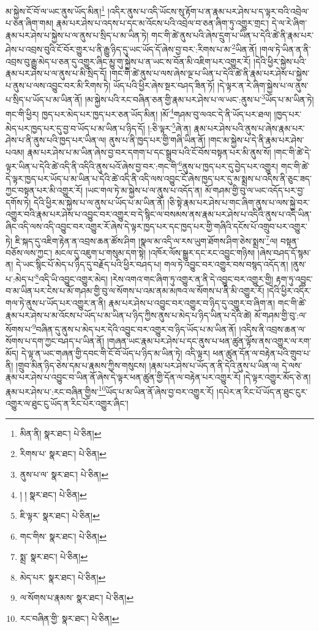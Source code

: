 མ་སྐྱེས་ངོ་བོ་ལ་ཡང་ནུས་ཡོད་མིན།\footnote{མིན་ནི།  སྣར་ཐང་།  པེ་ཅིན། } །འདིར་ནུས་པ་འདི་ཡོངས་སུ་རྟོག་པ་ན་རྣམ་པར་ཤེས་པ་ད་ལྟར་བའི་འབྲེལ་པ་ཅན་ཞིག་གམ། རྣམ་པར་ཤེས་པ་འདས་པ་དང་མ་འོངས་པའི་འབྲེལ་བ་ཅན་ཞིག་ཏུ་འགྱུར་གྲང་། དེ་ལ་རེ་ཞིག་རྣམ་པར་ཤེས་པ་སྐྱེས་པ་ལ་ནུས་པ་སྲིད་པ་མ་ཡིན་ཏེ། གང་གི་ཚེ་ནུས་པའི་ཞེས་དྲུག་པ་ཡིན་པ་དེའི་ཚེ་ནི་རྣམ་པར་ཤེས་པ་འབྲས་བུའི་ངོ་བོར་གྱུར་པ་ནི་རྒྱུ་ཉིད་དུ་ཡང་ཡོད་དོ་ཞེས་བྱ་བར་:རིགས་པ་མ་\footnote{རིགས་པ་  སྣར་ཐང་།  པེ་ཅིན། }ཡིན་ནོ། །གལ་ཏེ་ཡིན་ན་ནི་འབྲས་བུ་རྒྱུ་མེད་པ་ཅན་དུ་འགྱུར་ཞིང་མྱུ་གུ་སྐྱེས་པ་ན་ཡང་ས་བོན་མི་འཇིག་པར་འགྱུར་རོ། །དེའི་ཕྱིར་སྐྱེས་པའི་རྣམ་པར་ཤེས་པ་ལ་ནུས་པ་མི་སྲིད་དོ། །གང་གི་ཚེ་ནུས་པ་ལས་ཞེས་ལྔ་པ་ཡིན་པ་དེའི་ཚེ་ནི་རྣམ་པར་ཤེས་པ་སྐྱེས་པ་ནུས་པ་ལས་འབྱུང་བར་མི་རིགས་ཏེ། ཡོད་པའི་ཕྱིར་ཞེས་སྔར་བཤད་ཟིན་ཏོ། །དེ་ལྟར་ན་རེ་ཞིག་སྐྱེས་པ་ལ་ནུས་པ་སྲིད་པ་ཡོད་པ་མ་ཡིན་ནོ། །མ་སྐྱེས་པའི་རང་བཞིན་ཅན་གྱི་རྣམ་པར་ཤེས་པ་ལ་ཡང་:ནུས་པ་\footnote{ནུས་པ་ལ་  སྣར་ཐང་།  པེ་ཅིན། }ཡོད་པ་མ་ཡིན་ཏེ། གང་གི་ཕྱིར། ཁྱད་པར་མེད་པར་ཁྱད་པར་ཅན་ཡོད་མིན། །མོ་\footnote{། །  སྣར་ཐང་།  པེ་ཅིན། }གཤམ་བུ་ལའང་དེ་ནི་ཡོད་པར་ཐལ། །ཁྱད་པར་མེད་པར་ཁྱད་པར་དུ་བྱ་བ་ཡོད་པ་མ་ཡིན་པ་ཉིད་དོ། །:ཅི་ལྟར་\footnote{ཇི་ལྟར་  སྣར་ཐང་།  པེ་ཅིན། }ཞེ་ན། རྣམ་པར་ཤེས་པའི་ནུས་པ་ཞེས་རྣམ་པར་ཤེས་པ་ནི་ནུས་པའི་ཁྱད་པར་ཡིན་ལ། ནུས་པ་ནི་ཁྱད་པར་གྱི་གཞི་ཡིན་ནོ། །གང་མ་སྐྱེས་པ་དེ་ནི་རྣམ་པར་ཤེས་པའམ། རྣམ་པར་ཤེས་པ་མ་ཡིན་ཞེས་བྱ་བར་དགག་པ་དང་སྒྲུབ་པའི་ངོ་བོས་བསྟན་པར་མི་ནུས་སོ། །གང་གི་ཚེ་དེ་ལྟར་ཡིན་པ་དེའི་ཚེ་འདི་ནི་འདིའི་ནུས་པའོ་ཞེས་བྱ་བར་:གང་གི་\footnote{གང་གིས་  སྣར་ཐང་།  པེ་ཅིན། }ནུས་པ་ཁྱད་པར་དུ་བྱེད་པར་འགྱུར། གང་གི་ཚེ་དེ་ལྟར་ཁྱད་པར་ཡོད་པ་མ་ཡིན་པ་དེའི་ཚེ་འདི་ནི་འདི་ལས་འབྱུང་ངོ་ཞེས་ཁྱད་པར་དུ་མ་སྨྲས་པ་འདིས་ནི་ཅུང་ཟད་ཀྱང་བསྟན་པར་མི་འགྱུར་རོ། །ཡང་གལ་ཏེ་མ་སྐྱེས་པ་ལ་ནུས་པ་འདོད་ན། མོ་གཤམ་གྱི་བུ་ལ་ཡང་འདོད་པར་བྱ་དགོས་ཏེ། དེའི་ཕྱིར་མ་སྐྱེས་པ་ལ་ནུས་པ་ཡོད་པ་མ་ཡིན་ནོ། །ཅི་སྟེ་རྣམ་པར་ཤེས་པ་གང་ཞིག་ནུས་པ་ལས་སྐྱེ་བར་འགྱུར་བའི་རྣམ་པར་ཤེས་པ་འབྱུང་བར་འགྱུར་བ་དེ་སྙིང་ལ་བསམས་ནས་རྣམ་པར་ཤེས་པ་འདིའི་ནུས་པ་འདི་ཡིན་ཞིང་འདི་ལས་འདི་འབྱུང་བར་འགྱུར་རོ་ཞེས་དེ་ལྟར་ཁྱད་པར་དང་ཁྱད་པར་གྱི་གཞིའི་དངོས་པོ་འགྲུབ་པར་འགྱུར་ཏེ། ཇི་སྐད་དུ་འཇིག་རྟེན་ན་འབྲས་ཆན་ཚོས་ཤིག །སྣལ་མ་འདི་ལ་རས་ཡུག་ཐོགས་ཤིག་ཅེས་སྨྲས་\footnote{སྨྲ་  སྣར་ཐང་།  པེ་ཅིན། }ལ། བསྟན་བཅོས་ལས་ཀྱང་། མངལ་དུ་འཇུག་པ་གསུམ་དག་སྟེ། །འཁོར་ལོས་སྒྱུར་དང་རང་འབྱུང་གཉིས། །ཞེས་བཤད་དོ་སྙམ་ན། དེ་ཡང་སྙིང་པོ་མེད་པ་ཉིད་དུ་བརྗོད་པའི་ཕྱིར་བཤད་པ། གལ་ཏེ་འབྱུང་བར་འགྱུར་བས་བསྙད་འདོད་ན། །ནུས་པ་:མེད་པ་\footnote{མེད་པར་  སྣར་ཐང་།  པེ་ཅིན། }འདི་ཡི་འབྱུང་འགྱུར་མེད། །རེས་འགའ་གང་ཞིག་ཏུ་འགྱུར་ན་ནི་དེ་འབྱུང་བར་འགྱུར་གྱི། རྟག་ཏུ་འབྱུང་བ་མ་ཡིན་པར་ངེས་པ་མོ་གཤམ་གྱི་བུ་ལ་སོགས་པ་འམ་ནམ་མཁའ་ལ་སོགས་པ་ནི་མི་འགྱུར་རོ། །དེའི་ཕྱིར་འདིར་གལ་ཏེ་ནུས་པ་ཡོད་པར་འགྱུར་ན་ནི། རྣམ་པར་ཤེས་པ་འབྱུང་བར་འགྱུར་བ་ཉིད་དུ་འགྱུར་བ་ཞིག་ན། གང་གི་ཚེ་རྣམ་པར་ཤེས་པ་མ་འོངས་པ་ཡོད་པ་མ་ཡིན་པ་ཉིད་ཀྱིས་ནུས་པ་མེད་པ་ཉིད་ཡིན་པ་དེའི་ཚེ། མོ་གཤམ་གྱི་བུ་:ལ་སོགས་པ་\footnote{ལ་སོགས་པ་རྣམས་  སྣར་ཐང་།  པེ་ཅིན། }བཞིན་དུ་ནུས་པ་མེད་པར་དེའི་འབྱུང་བར་འགྱུར་བ་ཉིད་ཡོད་པ་མ་ཡིན་ནོ། །འདིས་ནི་འབྲས་ཆན་ལ་སོགས་པ་དག་ཀྱང་བཤད་པ་ཡིན་ནོ། །གཞན་ཡང་རྣམ་པར་ཤེས་པ་དང་ནུས་པ་ཕན་ཚུན་ལྟོས་ནས་འགྱུར་ལ་རག་མོད། དེ་ལྟ་ན་ཡང་གཞན་གྱི་དབང་གི་ངོ་བོ་ཡོད་པ་ཉིད་མ་ཡིན་ཏེ། འདི་ལྟར། ཕན་ཚུན་དོན་ལ་བརྟེན་པའི་གྲུབ་པ་ནི། །གྲུབ་མིན་ཉིད་ཅེས་དམ་པ་རྣམས་ཀྱིས་གསུངས། །རྣམ་པར་ཤེས་པ་ཡོད་ན་ནི་དེའི་ནུས་པ་ཡིན་ལ། དེ་ལས་རྣམ་པར་ཤེས་པ་འབྱུང་བ་ཡིན་ནོ་ཞེས་དེ་ལྟར་ཕན་ཚུན་གྱི་དོན་ལ་བརྟེན་པར་འགྱུར་རོ། །དེ་ལྟར་འགྱུར་མོད་ཅེ་ན། རྣམ་པར་ཤེས་པ་:རང་བཞིན་གྱིས་\footnote{རང་བཞིན་གྱི་  སྣར་ཐང་།  པེ་ཅིན། }ཡོད་པ་མ་ཡིན་ནོ་ཞེས་བྱ་བར་འགྱུར་རོ། །དཔེར་ན་རིང་པོ་ཡོད་ན་ཐུང་ངུར་འགྱུར་ལ་ཐུང་ངུ་ཡོད་ན་རིང་པོར་འགྱུར་ཞིང་། 